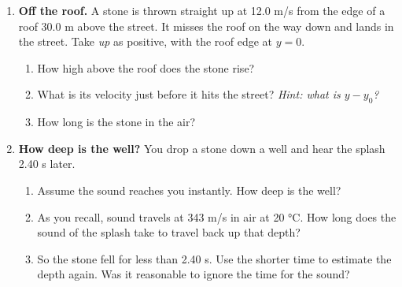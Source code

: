 \documentclass[12pt, twoside]{article}
\begin{document}
\begin{enumerate}[itemsep=0.4cm, start=9]
\newpage

\item \textbf{Off the roof.} A stone is thrown straight up at 12.0 m/s from the edge
  of a roof 30.0 m above the street. It misses the roof on the way down and lands
  in the street. Take \emph{up} as positive, with the roof edge at $y = 0$.
  \begin{enumerate}[itemsep=0.4cm]
    \item How high above the roof does the stone rise?
      \vspace{2.8cm}
    \item What is its velocity just before it hits the street? \emph{Hint: what is
      $y - y_0$?}
      \vspace{3.0cm}
    \item How long is the stone in the air?
      \vspace{2.4cm}
  \end{enumerate}

\item \textbf{How deep is the well?} You drop a stone down a well and hear the
  splash 2.40 s later.
  \begin{enumerate}[itemsep=0.4cm]
    \item Assume the sound reaches you instantly. How deep is the well?
      \vspace{2.4cm}
    \item As you recall, sound travels at 343 m/s in air at 20 \si{\celsius}. How
      long does the sound of the splash take to travel back up that depth?
      \vspace{1.8cm}
    \item So the stone fell for less than 2.40 s. Use the shorter time to estimate
      the depth again. Was it reasonable to ignore the time for the sound?
  \end{enumerate}

\end{enumerate}
\end{document}
